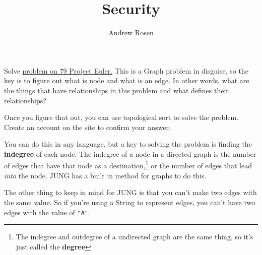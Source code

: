 \documentclass[10pt,letterpaper]{article}
\author{Andrew Rosen}
\title{Security}
\date{}
\begin{document}
	
	\maketitle
	
	Solve \href{https://projecteuler.net/problem=79}{problem on 79 Project Euler.}  
	This is a Graph problem in disguise, so the key is to figure out what is node and what is an edge.
	In other words, what are the things that have relationships in this problem and what defines their relationships? 
	
	Once you figure that out, you can use topological sort to solve the problem.
	Create an account on the site to confirm your answer.

 	You can do this in any language, but a key to solving the problem is finding the \textbf{indegree} of each node.
 	The indegree of a node in a directed graph is the number of edges that have that node as a destination,\footnote{The indegree and outdegree of a undirected graph are the same thing, so it's just called the \textbf{degree}} or the number of edges that lead  \textit{into} the node.
 	JUNG has a built in method for graphs to do this.  
 	
 	The other thing to keep in mind for JUNG is that you can't make two edges with the same value.
 	So if you're using a String to represent edges, you can't have two edges with the value of \texttt{"A"}.
 	
\end{document}
